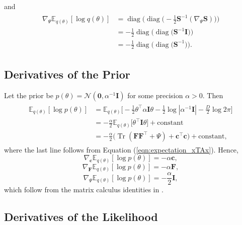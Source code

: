\documentclass[msc,deptreport.inf]{infthesis} %
\newcommand{\matr}[1]{\mathbf{#1}}
\newcommand{\E}{\mathbb E}
\newcommand{\diag}{\mathop{\mathrm{diag}}}
\newcommand{\tr}{\mathop{\mathrm{Tr}}}
\begin{document}
and
\begin{align}
\begin{split}\label{eqn:grad_vi_dist_wrt_Psi}
	\nabla_\Psi \E_{q(\theta)} [\log q(\theta)]
	& = \diag\Big(\diag\Big(-\frac{1}{2} \matr{S}^{-1} (\nabla_\Psi \matr{S}) \Big)\Big) \\
	& = -\frac{1}{2} \diag\big(\diag\big(\matr{S}^{-1} \matr{I}\big)\big) \\
	& = -\frac{1}{2} \diag\big(\diag\big(\matr{S}^{-1}\big)\big).
\end{split}
\end{align}

\subsection{Derivatives of the Prior}

Let the prior be $p(\theta) = \mathcal{N}(\matr{0}, \alpha^{-1} \matr{I})$ for some precision $\alpha > 0$. Then
\begin{align}
\begin{split}
	\E_{q(\theta)} [\log p(\theta)]
	& = \E_{q(\theta)} \Big[-\frac{1}{2} \theta^\intercal \alpha \matr{I} \theta  - \frac{1}{2} \log |\alpha^{-1} \matr{I}| - \frac{D}{2} \log 2\pi\Big] \\
	& = -\frac{\alpha}{2} \E_{q(\theta)} \Big[ \theta^\intercal \matr{I} \theta \Big] + \text{constant} \\
	& = -\frac{\alpha}{2}\big( \tr(\matr{FF}^{\intercal} + \Psi) + \matr{c}^\intercal \matr{c} \big)+ \text{constant},
\end{split}
\end{align}
where the last line follows from Equation (\ref{eqn:expectation_xTAx}). Hence, 
\begin{equation}
	\nabla_\matr{c} \E_{q(\theta)} [\log p(\theta)] = -\alpha \matr{c},
\end{equation}
\begin{equation}
	\nabla_\matr{F} \E_{q(\theta)} [\log p(\theta)] = -\alpha \matr{F},
\end{equation}
\begin{equation}\label{eqn:grad_prior_wrt_psi}
	\nabla_\Psi \E_{q(\theta)} [\log p(\theta)] = -\frac{\alpha}{2} \matr{I},
\end{equation}
which follow from the matrix calculus identities in \cite{petersen2012}.

\subsection{Derivatives of the Likelihood}
\end{document}
